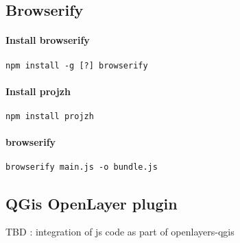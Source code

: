 \subsection*{Browserify}

\paragraph{Install browserify}

\texttt{npm install -g [?] browserify}

\paragraph{Install projzh}

\texttt{npm install projzh}

\paragraph{browserify}

\texttt{browserify main.js -o bundle.js}



\subsection*{QGis OpenLayer plugin}

TBD : integration of js code as part of openlayers-qgis













